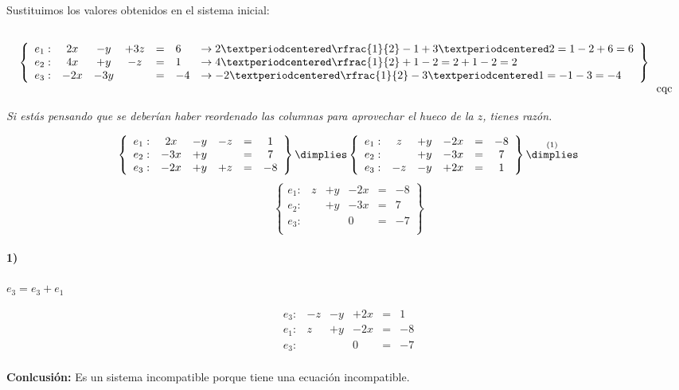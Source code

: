 \documentclass[palatino,nosec,nochap]{Docencia}
\begin{document}
\begin{problem}
Sustituimos los valores obtenidos en el sistema inicial:

\[
\left\{\begin{array}{lccccll}
e_1: &	2x &	-	y &		+3z &	= & 6 &\to 2·\rfrac{1}{2} - 1 + 3·2 = 1-2+6=6\\
e_2: &	4x &	+	y &		-z &	= & 1 &\to 4·\rfrac{1}{2} + 1 - 2 = 2+1-2 = 2\\
e_3: &	-2x &	-  3y &		 &	= & -4 &\to -2·\rfrac{1}{2} - 3·1 = -1-3 = -4
\end{array}\right\}\begin{array}{c}\\\\\\\\\text{cqc}\end{array}
\]

\textit{Si estás pensando que se deberían haber reordenado las columnas para aprovechar el hueco de la $z$, tienes razón.}



\spart 

\[
\left\{\begin{array}{lccccc}
e_1: &	2x &	-	y &		-z &	= & 1 \\
e_2: &	-3x &	+	y &		   &	= & 7 \\
e_3: &	-2x &	+   y &		+z&	= & -8 
\end{array}\right\}
\dimplies
\left\{\begin{array}{lccccc}
e_1: & z & +  y & -2x & = & -8 \\	
e_2: &   & +  y & -3x & = & 7  \\
e_3: &-z & -  y & +2x & = & 1
\end{array}\right\}
\overset{(1)}{\dimplies}
\]\[
\left\{\begin{array}{lccccc}
e_1: & z & +  y & -2x & = & -8 \\	
e_2: &   & +  y & -3x & = & 7  \\
e_3: &	 &		&    0&	= & -7\\
\end{array}\right\}
\]


\paragraph{1)} $e_3 = e_3+e_1$

\[
\begin{array}{rccccc}
e_3: &-z & -  y & +2x & = & 1\\
e_1: & z & +  y & -2x & = & -8 \\	
\hline
e_3: &	 &		&    0&	= & -7\\
\end{array}
\]	


\textbf{Conlcusión:} Es un sistema incompatible porque tiene una ecuación incompatible.

\end{problem}
\end{document}
